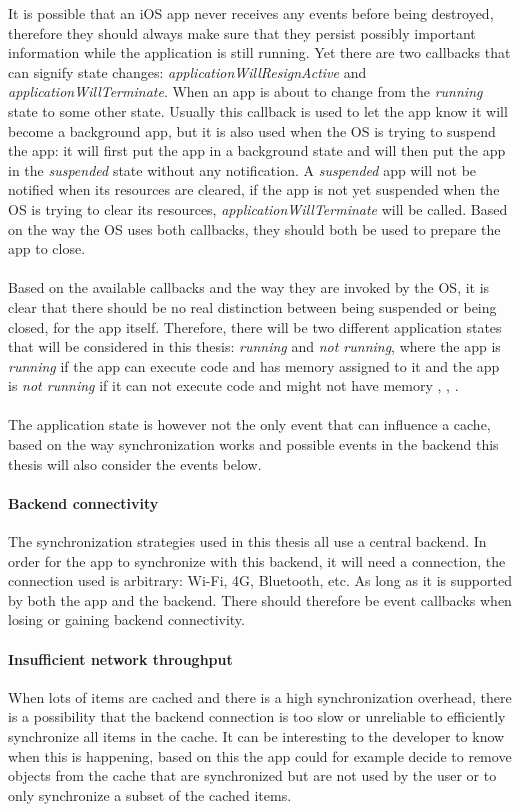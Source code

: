 \documentclass[pdftex,a4paper,12pt,twoside]{report}
\begin{document}
It is possible that an iOS app never receives any events before being destroyed, therefore they should always make sure that they persist possibly important information while the application is still running. Yet there are two callbacks that can signify state changes: \emph{applicationWillResignActive} and \emph{applicationWillTerminate}. When an app is about to change from the \emph{running} state to some other state. Usually this callback is used to let the app know it will become a background app, but it is also used when the OS is trying to suspend the app: it will first put the app in a background state and will then put the app in the \emph{suspended} state without any notification. A \emph{suspended} app will not be notified when its resources are cleared, if the app is not yet suspended when the OS is trying to clear its resources, \emph{applicationWillTerminate} will be called. Based on the way the OS uses both callbacks, they should both be used to prepare the app to close.
\\\\
Based on the available callbacks and the way they are invoked by the OS, it is clear that there should be no real distinction between being suspended or being closed, for the app itself. Therefore, there will be two different application states that will be considered in this thesis: \emph{running} and \emph{not running}, where the app is \emph{running} if the app can execute code and has memory assigned to it and the app is \emph{not running} if it can not execute code and might not have memory \citep{events_android}, \citep{events_uwp}, \citep{events_ios}.
\\\\
The application state is however not the only event that can influence a cache, based on the way synchronization works and possible events in the backend this thesis will also consider the events below.
\paragraph{Backend connectivity} The synchronization strategies used in this thesis all use a central backend. In order for the app to synchronize with this backend, it will need a connection, the connection used is arbitrary: Wi-Fi, 4G, Bluetooth, etc. As long as it is supported by both the app and the backend. There should therefore be event callbacks when losing or gaining backend connectivity.
\paragraph{Insufficient network throughput} When lots of items are cached and there is a high synchronization overhead, there is a possibility that the backend connection is too slow or unreliable to efficiently synchronize all items in the cache. It can be interesting to the developer to know when this is happening, based on this the app could for example decide to remove objects from the cache that are synchronized but are not used by the user or to only synchronize a subset of the cached items.
\end{document}
